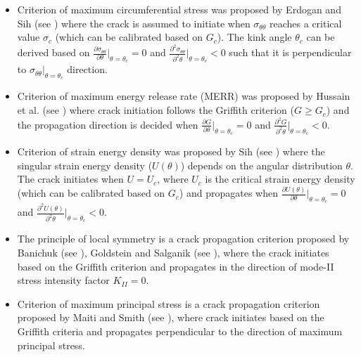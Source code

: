 \documentclass[11pt] {article}
\begin{document}
\begin{itemize}
	\item Criterion of maximum circumferential stress was proposed by Erdogan and Sih (see \cite{erdogan_1963}) where the crack is assumed to initiate when $\sigma_{\theta \theta}$ reaches a critical value $\sigma_c$ (which can be calibrated based on $G_c$). The kink angle $\theta_c$ can be derived based on $\frac{\partial \sigma_{\theta \theta}}{\partial \theta}\big|_{\theta=\theta_c} = 0$ and $\frac{\partial^2 \sigma_{\theta \theta}}{\partial^2 \theta}\big|_{\theta=\theta_c} < 0$ such that it is perpendicular to $\sigma_{\theta \theta}\big|_{\theta = \theta_c}$ direction.
	\item Criterion of maximum energy release rate (MERR) was proposed by Hussain et al. (see \cite{hussain_1974}) where crack initiation follows the Griffith criterion ($G \ge G_c$) and the propagation direction is decided when $\frac{\partial G}{\partial \theta}\big|_{\theta=\theta_c} = 0$ and $\frac{\partial^2 G}{\partial^2 \theta}\big|_{\theta=\theta_c} < 0$.
	\item Criterion of strain energy density was proposed by Sih (see \cite{sih_1974}) where the singular strain energy density ($U(\theta)$) depends on the angular distribution $\theta$. The crack initiates when $U=U_c$, where $U_c$ is the critical strain energy density (which can be calibrated based on $G_c$) and propagates when $\frac{\partial U(\theta)}{\partial \theta}\big|_{\theta=\theta_c} = 0$ and $\frac{\partial^2 U(\theta)}{\partial^2 \theta}\big|_{\theta=\theta_c}  < 0$.
	\item The principle of local symmetry is a crack propagation criterion proposed by Banichuk (see \cite{banichuk_1970}), Goldstein and Salganik (see \cite{goldshtein_1970,gol_1974}), where the crack initiates based on the Griffith criterion and propagates in the direction of mode-II stress intensity factor $K_{II}=0$.
	\item Criterion of maximum principal stress is a crack propagation criterion proposed by Maiti and Smith (see \cite{maiti_1984}), where crack initiates based on the Griffith criteria and propagates perpendicular to the direction of maximum principal stress.
\end{itemize}
\end{document}
